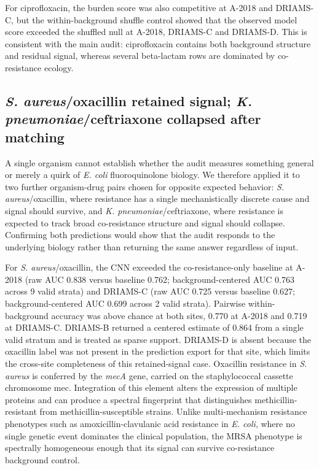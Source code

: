 \documentclass[11pt]{article}
\begin{document}
For ciprofloxacin, the burden score was also competitive at A-2018 and DRIAMS-C, but the within-background shuffle control showed that the observed model score exceeded the shuffled null at A-2018, DRIAMS-C and DRIAMS-D. This is consistent with the main audit: ciprofloxacin contains both background structure and residual signal, whereas several beta-lactam rows are dominated by co-resistance ecology.

\subsection*{\textit{S. aureus}/oxacillin retained signal; \textit{K. pneumoniae}/ceftriaxone collapsed after matching}

A single organism cannot establish whether the audit measures something general or merely a quirk of \textit{E. coli} fluoroquinolone biology. We therefore applied it to two further organism-drug pairs chosen for opposite expected behavior: \textit{S. aureus}/oxacillin, where resistance has a single mechanistically discrete cause and signal should survive, and \textit{K. pneumoniae}/ceftriaxone, where resistance is expected to track broad co-resistance structure and signal should collapse. Confirming both predictions would show that the audit responds to the underlying biology rather than returning the same answer regardless of input.

For \textit{S. aureus}/oxacillin, the CNN exceeded the co-resistance-only baseline at A-2018 (raw AUC 0.838 versus baseline 0.762; background-centered AUC 0.763 across 9 valid strata) and DRIAMS-C (raw AUC 0.725 versus baseline 0.627; background-centered AUC 0.699 across 2 valid strata). Pairwise within-background accuracy was above chance at both sites, 0.770 at A-2018 and 0.719 at DRIAMS-C. DRIAMS-B returned a centered estimate of 0.864 from a single valid stratum and is treated as sparse support. DRIAMS-D is absent because the oxacillin label was not present in the prediction export for that site, which limits the cross-site completeness of this retained-signal case. Oxacillin resistance in \textit{S. aureus} is conferred by the \textit{mecA} gene, carried on the staphylococcal cassette chromosome mec\cite{chambers1997mrsa}. Integration of this element alters the expression of multiple proteins and can produce a spectral fingerprint that distinguishes methicillin-resistant from methicillin-susceptible strains. Unlike multi-mechanism resistance phenotypes such as amoxicillin-clavulanic acid resistance in \textit{E. coli}, where no single genetic event dominates the clinical population, the MRSA phenotype is spectrally homogeneous enough that its signal can survive co-resistance background control.
\end{document}
